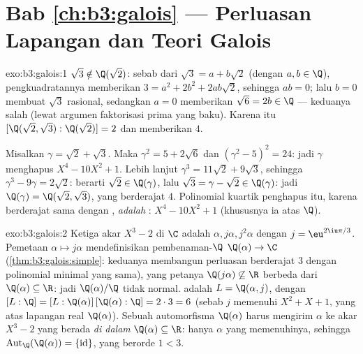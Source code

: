 \section*{Bab \ref{ch:b3:galois} --- Perluasan Lapangan dan
Teori Galois}

\begin{solution}{exo:b3:galois:1}
$\sqrt3 \notin \Q(\sqrt2)$: sebab dari $\sqrt3 = a + b\sqrt2$ (dengan $a, b
\in \Q$), pengkuadratannya memberikan $3 = a^2 + 2b^2 + 2ab\sqrt2$, sehingga $ab =
0$; lalu $b = 0$ membuat $\sqrt3$ rasional, sedangkan $a = 0$ memberikan $\sqrt6 = 2b
\in \Q$ --- keduanya salah (lewat argumen faktorisasi prima yang baku).
Karena itu $[\Q(\sqrt2,\sqrt3) : \Q(\sqrt2)] = 2$ dan 
memberikan  $4$.

Misalkan $\gamma = \sqrt2 + \sqrt3$. Maka $\gamma^2 = 5 + 2\sqrt6$ dan
$(\gamma^2 - 5)^2 = 24$: jadi $\gamma$ menghapus $X^4 - 10X^2 + 1$.
Lebih lanjut $\gamma^3 = 11\sqrt2 + 9\sqrt3$, sehingga $\gamma^3 - 9\gamma
= 2\sqrt2$: berarti $\sqrt2 \in \Q(\gamma)$, lalu $\sqrt3 = \gamma -
\sqrt2 \in \Q(\gamma)$: jadi $\Q(\gamma) = \Q(\sqrt2,\sqrt3)$, yang
berderajat $4$. Polinomial kuartik penghapus itu, karena berderajat sama dengan
, \emph{adalah} : $X^4 -
10X^2 + 1$ (khususnya ia  atas $\Q$).
\end{solution}

\begin{solution}{exo:b3:galois:2}
Ketiga akar $X^3 - 2$ di $\C$ adalah $\alpha, j\alpha,
j^2\alpha$ dengan $j = \eu^{2\iu\pi/3}$. Pemetaan $\alpha \mapsto
j\alpha$ mendefinisikan pembenaman-$\Q$ $\Q(\alpha) \to \C$
(\cref{thm:b3:galois:simple}: keduanya membangun perluasan berderajat $3$
dengan polinomial minimal yang sama), yang petanya $\Q(j\alpha)
\not\subseteq \R$ berbeda dari $\Q(\alpha) \subseteq \R$: jadi
$\Q(\alpha)/\Q$ tidak normal.  adalah $L =
\Q(\alpha, j)$, dengan $[L:\Q] = [L:\Q(\alpha)]\,[\Q(\alpha):\Q] =
2 \cdot 3 = 6$ (sebab $j$ memenuhi $X^2 + X + 1$, yang  atas
lapangan real $\Q(\alpha)$). Sebuah automorfisma $\Q(\alpha)$
harus mengirim $\alpha$ ke akar $X^3 - 2$ yang berada \emph{di dalam}
$\Q(\alpha) \subseteq \R$: hanya $\alpha$ yang memenuhinya, sehingga
$\operatorname{Aut}_\Q(\Q(\alpha)) = \{\mathrm{id}\}$, yang berorde
$1 < 3$.
\end{solution}

